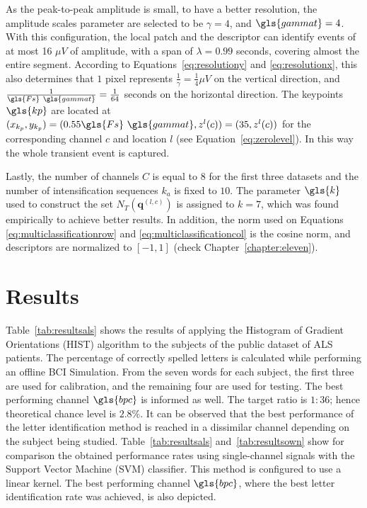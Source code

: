 As the peak-to-peak amplitude is small, to have a better resolution, the amplitude scales parameter are selected to be  $ \gamma = 4 $, and $\gls{gammat} = 4$.  With this configuration, the local patch and the descriptor can identify events of at most 16 $ \mu V $ of amplitude, with a span of $ \lambda = 0.99$ seconds, covering almost the entire segment.  According to Equations~\ref{eq:resolutiony} and \ref{eq:resolutionx}, this also determines that $ 1 $ pixel represents $ \frac{1}{\gamma}= \frac{1}{4} \mu V $ on the vertical direction, and $\frac{1}{\gls{Fs} \ \gls{gammat} }=\frac{1}{64}$ seconds on the horizontal direction. The keypoints  $\gls{kp}$  are located at $ (x_{k_p}, y_{k_p} )= ( 0.55 \gls{Fs} \ \gls{gammat}, z^l(c) )= (35,  z^l(c)) $ for the corresponding channel $c$ and location $l$ (see Equation~\ref{eq:zerolevel}).   In this way the whole transient event is captured. 

Lastly, the number of channels $C$ is equal to $8$ for the first three datasets and the number of intensification sequences $k_a$ is fixed to $10$.  The parameter $\gls{k}$ used to construct the set $N_T(\mathbf{q}^{(l,c)})$ is assigned to $k=7$, which was found empirically to achieve better results.  In addition, the norm used on  Equations \ref{eq:multiclassificationrow} and \ref{eq:multiclassificationcol} is the cosine norm, and descriptors are normalized to $ \left[ -1, 1 \right] $ (check Chapter~\ref{chapter:eleven}).

\section{Results}

Table~\ref{tab:resultsals} shows the results of applying the Histogram of Gradient Orientations (HIST) algorithm to the subjects of the public dataset of ALS patients. The percentage of correctly spelled letters is calculated while performing an offline BCI Simulation.  From the seven words for each subject, the first three are used for calibration, and the remaining four are used for testing.  The best performing channel  $\gls{bpc}$ is informed as well. The target ratio is $1:36$; hence theoretical chance level is $2.8\%$. It can be observed that the best performance of the letter identification method is reached in a dissimilar channel depending on the subject being studied.  Table~\ref{tab:resultsals} and~\ref{tab:resultsown} show for comparison the obtained performance rates using single-channel signals with the Support Vector Machine (SVM) classifier.  This method is configured to use a linear kernel.  The best performing channel $\gls{bpc}$, where the best letter identification rate was achieved, is also depicted.



